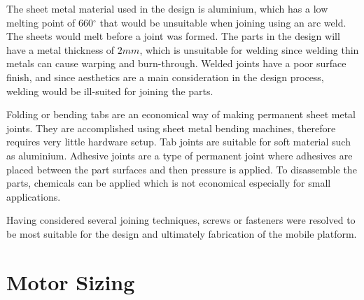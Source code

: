 The sheet metal material used in the design is aluminium, which has a low melting point of 660$^{\circ}$ \cite{noauthor_aluminium_nodate}  that would be unsuitable when joining using an arc weld. The sheets would melt before a joint was formed. The parts in the design will have a  metal thickness of $2mm$, which is unsuitable for welding since welding thin metals can cause warping and burn-through. Welded joints have a poor surface finish, and since aesthetics are a main consideration in the design process, welding would be ill-suited for joining the parts.
\par
Folding or bending tabs are an economical way of making permanent sheet metal joints. They are accomplished using sheet metal bending machines, therefore requires very little hardware setup. Tab joints are suitable for soft material such as aluminium. Adhesive joints are a type of permanent joint where adhesives are placed between the part surfaces and then pressure is applied. To disassemble the parts, chemicals can be applied which is not economical especially for small applications. 
\par
Having considered several joining techniques, screws or fasteners were resolved to be most suitable for the design and ultimately fabrication of the mobile platform. 

\section{Motor Sizing}

